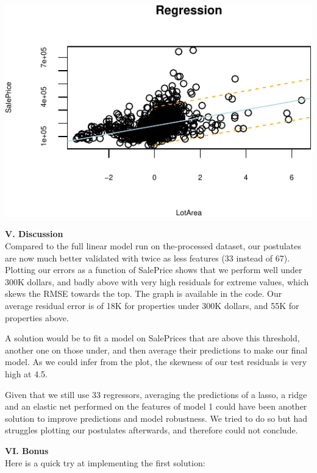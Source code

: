 \documentclass[]{article}
\begin{document}
\begin{center}\includegraphics{r_file_v5_files/figure-latex/unnamed-chunk-46-1} \end{center}

\textbf{V. Discussion}\\
Compared to the full linear model run on the-processed dataset, our
postulates are now much better validated with twice as less features (33
instead of 67).\\
Plotting our errors as a function of SalePrice shows that we perform
well under 300K dollars, and badly above with very high residuals for
extreme values, which skews the RMSE towards the top. The graph is
available in the code. Our average residual error is of 18K for
properties under 300K dollars, and 55K for properties above.

A solution would be to fit a model on SalePrices that are above this
threshold, another one on those under, and then average their
predictions to make our final model. As we could infer from the plot,
the skewness of our test residuals is very high at 4.5.

Given that we still use 33 regressors, averaging the predictions of a
lasso, a ridge and an elastic net performed on the features of model 1
could have been another solution to improve predictions and model
robustness. We tried to do so but had struggles plotting our postulates
afterwards, and therefore could not conclude.

\textbf{VI. Bonus}\\
Here is a quick try at implementing the first solution:
\end{document}
